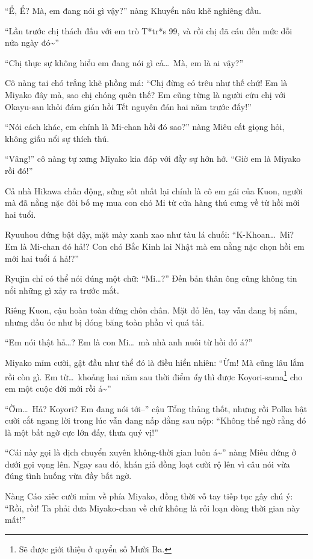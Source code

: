 \documentclass[../main.tex]{subfiles}
\begin{document}
``Ể, Ể? Mà, em đang nói gì vậy?'' nàng Khuyển nâu khẽ nghiêng đầu.

``Lần trước chị thách đấu với em trò T*tr*s 99, và rồi chị đã cáu đến mức dỗi nửa ngày đó\~{}''

``Chị thực sự không hiểu em đang nói gì cả\dots\ Mà, em là ai vậy?''

Cô nàng tai chó trắng khẽ phồng má: ``Chị đừng có trêu như thế chứ! Em là Miyako đây mà, sao chị chóng quên thế? Em cũng từng là người cứu chị với Okayu-san khỏi đám gián hồi Tết nguyên đán hai năm trước đấy!''

``Nói cách khác, em chính là Mi-chan hồi đó sao?'' nàng Miêu cất giọng hỏi, không giấu nổi sự thích thú.

``Vâng!'' cô nàng tự xưng Miyako kia đáp với đầy sự hớn hở. ``Giờ em là Miyako rồi đó!''

Cả nhà Hikawa chấn động, sửng sốt nhất lại chính là cô em gái của Kuon, người mà đã nằng nặc đòi bố mẹ mua con chó Mi từ cửa hàng thú cưng về từ hồi mới hai tuổi.

Ryuuhou đứng bật dậy, mặt mày xanh xao như tàu lá chuối: ``K-Khoan\dots\ Mi? Em là Mi-chan đó hả!? Con chó Bắc Kinh lai Nhật mà em nằng nặc chọn hồi em mới hai tuổi á hả!?''

Ryujin chỉ có thể nói đúng một chữ: ``Mi\dots?'' Đến bản thân ông cũng không tin nổi những gì xảy ra trước mắt.

Riêng Kuon, cậu hoàn toàn đứng chôn chân. Mặt đỏ lên, tay vẫn đang bị nắm, nhưng đầu óc như bị đóng băng toàn phần vì quá tải.

``Em nói thật hả\dots? Em là con Mi\dots\ mà nhà anh nuôi từ hồi đó á?''

Miyako mỉm cười, gật đầu như thể đó là điều hiển nhiên: ``Ừm! Mà cũng lâu lắm rồi còn gì. Em từ\dots\ khoảng hai năm sau thời điểm \emph{ấy} thì được Koyori-sama\footnote{Sẽ được giới thiệu ở quyển số Mười Ba.} cho em một cuộc đời mới rồi á\~{}''

``Ờm\dots\ Hả? Koyori? Em đang nói tới--'' cậu Tổng thảng thốt, nhưng rồi Polka bật cười cắt ngang lời trong lúc vẫn đang nấp đằng sau nộp: ``Không thể ngờ rằng đó là một bất ngờ cực lớn đấy, thưa quý vị!''

``Cái này gọi là dịch chuyển xuyên không-thời gian luôn á\~{}'' nàng Miêu đứng ở dưới gọi vọng lên. Ngay sau đó, khán giả đồng loạt cười rộ lên vì câu nói vừa đúng tình huống vừa đầy bất ngờ.

Nàng Cáo xiếc cười mỉm về phía Miyako, đồng thời vỗ tay tiếp tục gây chú ý: ``Rồi, rồi! Ta phải đưa Miyako-chan về chứ không là rối loạn dòng thời gian này mất!''
\end{document}
